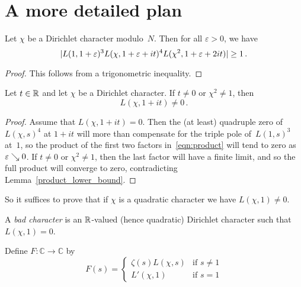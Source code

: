 \section{A more detailed plan}

\begin{lemma} \label{product_lower_bound}
  \leanok
  Let $\chi$ be a Dirichlet character modulo~$N$. Then for all $\varepsilon > 0$, we have
  \begin{equation} \label {eqn:product}
    |L(1, 1 + \varepsilon)^3 L(\chi, 1 + \varepsilon + it)^4 L(\chi^2, 1 + \varepsilon + 2it)| \ge 1 \,.
  \end{equation}
\end{lemma}

\begin{proof}
  \leanok
  This follows from a trigonometric inequality.
\end{proof}

\begin{lemma} \label{non_quadratic}
  \leanok
  Let $t \in \mathbb{R}$ and let $\chi$ be a Dirichlet character. If $t \ne 0$ or $\chi^2 \ne 1$, then
  \[ L(\chi, 1 + it) \ne 0 \,. \]
\end{lemma}

\begin{proof}
  \leanok
  Assume that $L(\chi, 1 + it) = 0$. Then the (at least) quadruple zero of~$L(\chi, s)^4$ at $1 + it$
  will more than compensate for the triple pole of~$L(1, s)^3$ at~$1$, so the product of the first
  two factors in~\eqref{eqn:product} will tend to zero as $\varepsilon \searrow 0$.
  If $t \ne 0$ or $\chi^2 \ne 1$, then the last factor will have a finite limit, and so the
  full product will converge to zero, contradicting Lemma~\ref{product_lower_bound}.
\end{proof}


So it suffices to prove that if $\chi$ is a quadratic character we have $L(\chi, 1) \ne 0$.

\begin{definition} \label{def:bad_char}
  \leanok
  A \emph{bad character} is an $\mathbb{R}$-valued (hence quadratic) Dirichlet character such that $L(\chi, 1) = 0$.
\end{definition}

\begin{definition} \label{def:bad_char_F}
  \leanok
  Define $F \colon \mathbb{C} \to \mathbb{C}$ by
  \[ F(s) = \begin{cases}
    \zeta(s) L(\chi, s) & \text{if $s \ne 1$} \\
    L'(\chi, 1) & \text{if $s = 1$}
    \end{cases}
  \]
\end{definition}

